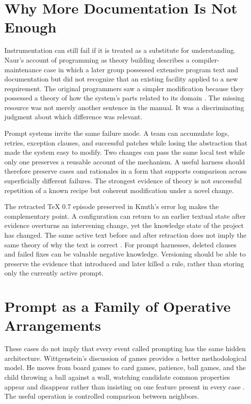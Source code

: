 \documentclass[11pt]{article}
\begin{document}
\section{Why More Documentation Is Not Enough}

Instrumentation can still fail if it is treated as a substitute for understanding. Naur's account of programming as theory building describes a compiler-maintenance case in which a later group possessed extensive program text and documentation but did not recognize that an existing facility applied to a new requirement. The original programmers saw a simpler modification because they possessed a theory of how the system's parts related to its domain \citep{naur1985programming}. The missing resource was not merely another sentence in the manual. It was a discriminating judgment about which difference was relevant.

Prompt systems invite the same failure mode. A team can accumulate logs, retries, exception clauses, and successful patches while losing the abstraction that made the system easy to modify. Two changes can pass the same local test while only one preserves a reusable account of the mechanism. A useful harness should therefore preserve cases and rationales in a form that supports comparison across superficially different failures. The strongest evidence of theory is not successful repetition of a known recipe but coherent modification under a novel change.

The retracted TeX 0.7 episode preserved in Knuth's error log makes the complementary point. A configuration can return to an earlier textual state after evidence overturns an intervening change, yet the knowledge state of the project has changed. The same active text before and after retraction does not imply the same theory of why the text is correct \citep{knuth1992literate}. For prompt harnesses, deleted clauses and failed fixes can be valuable negative knowledge. Versioning should be able to preserve the evidence that introduced and later killed a rule, rather than storing only the currently active prompt.

\section{Prompt as a Family of Operative Arrangements}

These cases do not imply that every event called prompting has the same hidden architecture. Wittgenstein's discussion of games provides a better methodological model. He moves from board games to card games, patience, ball games, and the child throwing a ball against a wall, watching candidate common properties appear and disappear rather than insisting on one feature present in every case \citep{wittgenstein1953philosophical}. The useful operation is controlled comparison between neighbors.
\end{document}
